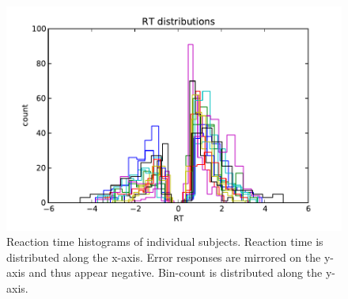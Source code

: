 \documentclass[letterpaper,10pt,english]{article}
\begin{document}
\begin{figure}[H]
\includegraphics[scale=0.6]{hddm_demo_fig_00.pdf}
\caption{Reaction time histograms of individual subjects. Reaction time is distributed along the x-axis. Error responses are mirrored on the y-axis and thus appear negative. Bin-count is distributed along the y-axis.}
\label{fig.rt_histograms}
\end{figure}
\end{document}
